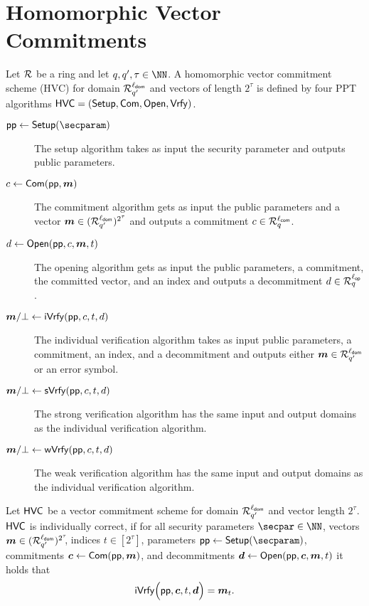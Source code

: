 \section{Homomorphic Vector Commitments}\label{sec:veccom}

\begin{definition}\label{def:hvc}
  Let $\mathcal{R}$ be a ring and let $q,q',\tau\in\NN$.
  A homomorphic vector commitment scheme (HVC) for domain $\mathcal{R}^{\ell_{\mathsf{dom}}}_{q'}$ and vectors of length $2^\tau$ is defined by four PPT algorithms $\mathsf{HVC}=(\mathsf{Setup},\mathsf{Com},\allowbreak\mathsf{Open},\mathsf{Vrfy})$.
\begin{description}
    \item[$\params\gets\setup(\secparam)$] The setup algorithm takes as input the security parameter and outputs public parameters.
    \item[$c \gets \mathsf{Com}(\mathsf{pp},\boldsymbol{m})$] The commitment algorithm gets as input the public parameters and a vector $\boldsymbol{m}\in(\mathcal{R}_{q'}^{\ell_{\mathsf{dom}}})^{2^\tau}$ and outputs a commitment $c\in\mathcal{R}_q^{\ell_{\mathsf{com}}}$.
    \item[$d \gets \mathsf{Open}(\mathsf{pp},c,\boldsymbol{m},t)$] The opening algorithm gets as input the public parameters, a commitment, the committed vector, and an index and outputs a decommitment $d\in\mathcal{R}_q^{{\ell_{\mathsf{op}}}}$.
    \item[$\boldsymbol{m}/\bot\gets \mathsf{iVrfy}(\mathsf{pp},c,t,d)$] The individual verification algorithm takes as input public parameters, a commitment, an index, and a decommitment and outputs either $\boldsymbol{m}\in\mathcal{R}^{\ell_{\mathsf{dom}}}_{q'}$ or an error symbol.
    \item[$\boldsymbol{m}/\bot\gets \mathsf{sVrfy}(\mathsf{pp},c,t,d)$] The strong verification algorithm has the same input and output domains as the individual verification algorithm.
    \item[$\boldsymbol{m}/\bot\gets \mathsf{wVrfy}(\mathsf{pp},c,t,d)$] The weak verification algorithm has the same input and output domains as the individual verification algorithm.
  \end{description}
\end{definition}
\begin{definition}
Let $\mathsf{HVC}$ be a vector commitment scheme for domain $\mathcal{R}^{\ell_{\mathsf{dom}}}_{q'}$ and vector length $2^\tau$.
  $\mathsf{HVC}$ is individually correct, if for all security parameters $\secpar\in\NN$, vectors $\boldsymbol{m}\in(\mathcal{R}_{q'}^{\ell_{\mathsf{dom}}})^{2^\tau}\!\!$, indices $t\in[2^\tau]$, parameters $\params \gets \setup(\secparam)$, commitments $\boldsymbol{c} \gets \mathsf{Com}(\mathsf{pp},\boldsymbol{m})$, and decommitments $\boldsymbol{d} \gets \mathsf{Open}(\mathsf{pp},\boldsymbol{c},\boldsymbol{m},t)$ it holds that
  \[
    \mathsf{iVrfy}\Bigl(\mathsf{pp},\boldsymbol{c},t,\boldsymbol{d}\Bigr) = \boldsymbol{m}_{t}.
  \]
\end{definition}

